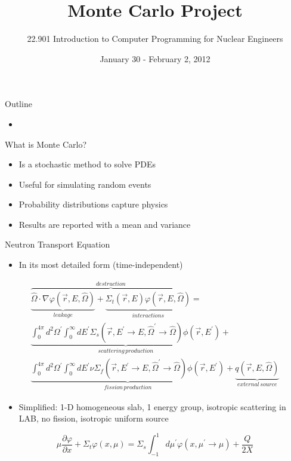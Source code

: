 \documentclass{beamer}
\title[]{Monte Carlo Project}
\author[]{22.901 Introduction to Computer Programming for Nuclear Engineers}
\institute[\insertpagenumber]{}
\date{January 30 - February 2, 2012}
\begin{document}

\frame{\titlepage}

\begin{frame}{Outline}
  \begin{itemize}
    \item 
  \end{itemize}
\end{frame}
\begin{frame}{What is Monte Carlo?}

  \begin{itemize}
    \item Is a stochastic method to solve PDEs
    \vfill\item Useful for simulating random events
    \vfill\item Probability distributions capture physics
    \vfill\item Results are reported with a mean and variance
  \end{itemize}

\end{frame}
\begin{frame}{Neutron Transport Equation}
  \scriptsize
  \begin{itemize}
    \item In its most detailed form (time-independent)
  \end{itemize}
  \vfill
\begin{multline*}
\overbrace{\underbrace{\hat{\Omega}\cdot\nabla\varphi\left(\vec{r},E,\hat{\Omega}\right)}_{leakage}+\underbrace{\Sigma_{t}\left(\vec{r},E\right)\varphi\left(\vec{r},E,\hat{\Omega}\right)}_{interactions}}^{destruction}=\\
\underbrace{\int_{0}^{4\pi}d^{2}\Omega^{\prime}\int_{0}^{\infty}dE^{\prime}\Sigma_{s}\left(\vec{r},E^{\prime}\rightarrow E,\hat{\Omega}^{\prime}\rightarrow\hat{\Omega}\right)\phi\left(\vec{r},E^{\prime}\right)}_{scattering\, production}+\\
\underbrace{\int_{0}^{4\pi}d^{2}\Omega^{\prime}\int_{0}^{\infty}dE^{\prime}\nu\Sigma_{f}\left(\vec{r},E^{\prime}\rightarrow E,\hat{\Omega}^{\prime}\rightarrow\hat{\Omega}\right)\phi\left(\vec{r},E^{\prime}\right)}_{fission\, production}+\underbrace{q\left(\vec{r},E,\hat{\Omega}\right)}_{external\, source}
\end{multline*}
  \vfill
  \begin{itemize}
    \item Simplified: 1-D homogeneous slab, 1 energy group, isotropic scattering in LAB, no fission, isotropic uniform source
  \end{itemize}
  \vfill
\[
\mu\frac{\partial\varphi}{\partial x}+\Sigma_{t}\varphi\left(x,\mu\right)=\Sigma_{s}\int_{-1}^{1}d\mu^{\prime}\varphi\left(x,\mu^{\prime}\rightarrow\mu\right)+\frac{Q}{2X} 
\]
\end{frame}
\end{document}
